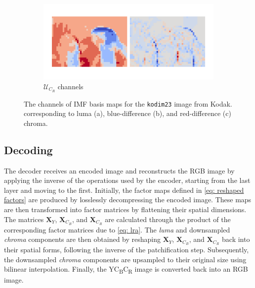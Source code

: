 \begin{figure}[t]
\begin{minipage}{0.35\textwidth}
\begin{minipage}{\textwidth}
        \end{minipage}
        \begin{minipage}{\textwidth}
            \begin{subfigure}{\textwidth}
                \centering
                \includegraphics[width=.95\textwidth]{figures/kodim23_cr_components.pdf}
                \vspace{-12pt}
                \caption{$\bm{\mathcal{U}}_{C_R}$ channels}
            \end{subfigure}%
        \end{minipage}
    \end{minipage}
    \caption{The channels of IMF basis maps for the \texttt{kodim23} image from Kodak. corresponding to luma (a), blue-difference (b), and red-difference (c) chroma.}
	\label{fig: imf_components}
\end{figure}


\subsection{Decoding} \label{sec: decoding}

The decoder receives an encoded image and reconstructs the RGB image by applying the inverse of the operations used by the encoder, starting from the last layer and moving to the first. Initially, the factor maps defined in \eqref{eq: reshaped factors} are produced by losslessly decompressing the encoded image. These maps are then transformed into factor matrices by flattening their spatial dimensions. The matrices $\bm{X}_{Y}$, $\bm{X}_{C_B}$, and $\bm{X}_{C_R}$ are calculated through the product of the corresponding factor matrices due to \eqref{eq: lra}. The \emph{luma} and downsampled \emph{chroma} components are then obtained by reshaping $\bm{X}_{Y}$, $\bm{X}_{C_B}$, and $\bm{X}_{C_R}$ back into their spatial forms, following the inverse of the patchification step. Subsequently, the downsampled \emph{chroma} components are upsampled to their original size using bilinear interpolation. Finally, the YC\textsubscript{B}C\textsubscript{R} image is converted back into an RGB image. 

